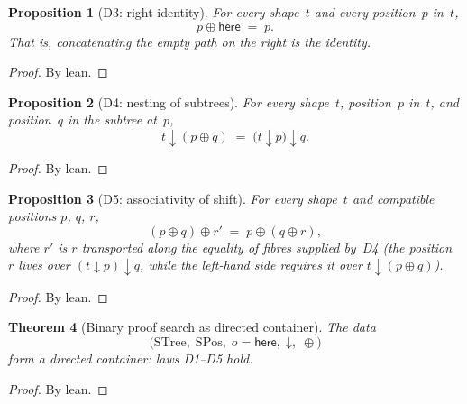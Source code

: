 \documentclass[11pt,a4paper]{article}
\theoremstyle{plain}
\newtheorem{theorem}{Theorem}[section]
\newtheorem{proposition}[theorem]{Proposition}
\theoremstyle{definition}
\newcommand{\STree}{\mathrm{STree}}
\newcommand{\SPos}{\mathrm{SPos}}
\begin{document}
\begin{proposition}[D3: right identity]\label{prop:d3}
For every shape~$t$ and every position~$p$ in~$t$,
\begin{equation}
  p \oplus \mathsf{here} \;=\; p.
\end{equation}
That is, concatenating the empty path on the right is the identity.
\end{proposition}

\begin{proof}
By lean.
\end{proof}

\begin{proposition}[D4: nesting of subtrees]\label{prop:d4}
For every shape~$t$, position~$p$ in~$t$, and position~$q$ in the subtree
at~$p$,
\begin{equation}
  t \mathbin{\downarrow} (p \oplus q)
  \;=\;
  \bigl(t \mathbin{\downarrow} p\bigr) \mathbin{\downarrow} q.
\end{equation}
\end{proposition}

\begin{proof}
By lean.
\end{proof}

\begin{proposition}[D5: associativity of shift]\label{prop:d5}
For every shape~$t$ and compatible positions $p$, $q$, $r$,
\begin{equation}
  (p \oplus q) \oplus r' \;=\; p \oplus (q \oplus r),
\end{equation}
where $r'$ is $r$ transported along the equality of fibres supplied
by~D4 (the position~$r$ lives over
$(t \mathbin{\downarrow} p) \mathbin{\downarrow} q$, while the left-hand
side requires it over $t \mathbin{\downarrow} (p \oplus q)$).
\end{proposition}

\begin{proof}
By lean.
\end{proof}

\begin{theorem}[Binary proof search as directed container]
\label{thm:proofsearch}
The data
\[
  \bigl(
    \STree,\;
    \SPos,\;
    o = \mathsf{here},\;
    {\mathord{\downarrow}},\;
    {\oplus}
  \bigr)
\]
form a directed container: laws D1--D5 hold.
\end{theorem}

\begin{proof}
By lean.
\end{proof}
\end{document}
